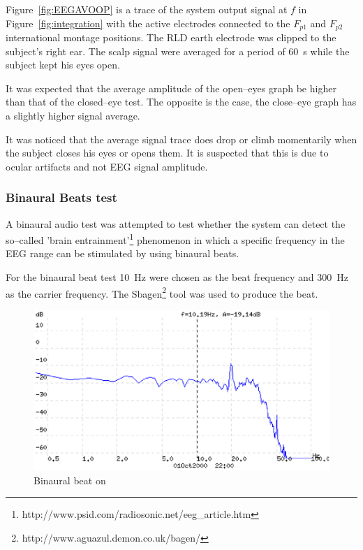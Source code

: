 Figure~\ref{fig:EEGAVOOP} is a trace of the system output signal at
$f$ in Figure~\ref{fig:integration} with the active electrodes
connected to the $F_{p1}$ and $F_{p2}$ international montage
positions. The RLD earth electrode was clipped to the subject's right
ear. The scalp signal were averaged for a period of 60~s while the
subject kept his eyes open.

It was expected that the average amplitude of the open--eyes graph be
higher than that of the closed--eye test. The opposite is the case,
the close--eye graph has a slightly higher signal average. 

It was noticed that the average signal trace does drop or climb
momentarily when the subject closes his eyes or opens them. It is
suspected that this is due to ocular artifacts and not EEG signal
amplitude.

\subsubsection{Binaural Beats test}

A binaural audio test was attempted to test whether the system can
detect the so--called 'brain
entrainment'\footnote{http://www.psid.com/radiosonic.net/eeg\_article.htm}
phenomenon in which a specific frequency in the EEG range can be
stimulated by using binaural beats.

For the binaural beat test 10~Hz were chosen as the beat frequency and
300~Hz as the carrier frequency. The
Sbagen\footnote{http://www.aguazul.demon.co.uk/bagen/} tool was used
to produce the beat.


\begin{figure}[htbp]
\begin{center}
	\includegraphics[width=\textwidth]{EEGAV2.ps} 
	\caption{Binaural beat on}
    \label{fig:EEGAV1}
\end{center}
\end{figure}

